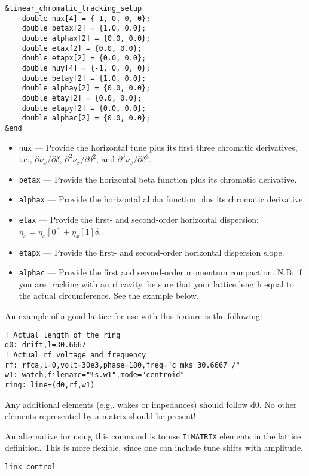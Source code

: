 \documentclass[11pt]{article}
\begin{document}
\begin{verbatim}
&linear_chromatic_tracking_setup
    double nux[4] = {-1, 0, 0, 0};
    double betax[2] = {1.0, 0.0};
    double alphax[2] = {0.0, 0.0};
    double etax[2] = {0.0, 0.0};
    double etapx[2] = {0.0, 0.0};
    double nuy[4] = {-1, 0, 0, 0};
    double betay[2] = {1.0, 0.0};
    double alphay[2] = {0.0, 0.0};
    double etay[2] = {0.0, 0.0};
    double etapy[2] = {0.0, 0.0};
    double alphac[2] = {0.0, 0.0};
&end
\end{verbatim}

\begin{itemize}
\item \verb|nux| --- Provide the horizontal tune plus its first three chromatic derivatives, i.e.,
  $\partial \nu_x/\partial\delta$, $\partial^2 \nu_x/\partial\delta^2$, and
  $\partial^3 \nu_x/\partial\delta^3$.
\item \verb|betax| --- Provide the horizontal beta function plus its chromatic derivative.
\item \verb|alphax| --- Provide the horizontal alpha function plus its chromatic derivative.
\item \verb|etax| --- Provide the first- and second-order horizontal dispersion:
  $\eta_x = \eta_x\left[0\right] + \eta_x\left[1\right]\delta$.
\item \verb|etapx| --- Provide the first- and second-order horizontal dispersion slope.
\item \verb|alphac| --- Provide the first and second-order momentum compaction.  N.B: if you are tracking
 with an rf cavity, be sure that your lattice length equal to the actual circumference.  See the example below.
\end{itemize}

An example of a good lattice for use with this feature is the following:
\begin{verbatim}
! Actual length of the ring
d0: drift,l=30.6667
! Actual rf voltage and frequency
rf: rfca,l=0,volt=30e3,phase=180,freq="c_mks 30.6667 /"
w1: watch,filename="%s.w1",mode="centroid"
ring: line=(d0,rf,w1)
\end{verbatim}
Any additional elements (e.g,. wakes or impedances) should follow d0.  No other elements represented by a matrix
should be present!

An alternative for using this command is to use {\tt ILMATRIX} elements in the lattice definition.  This is more
flexible, since one can include tune shifts with amplitude.

\newpage
\begin{center}{\Large\verb|link_control|}\end{center}
\end{document}
